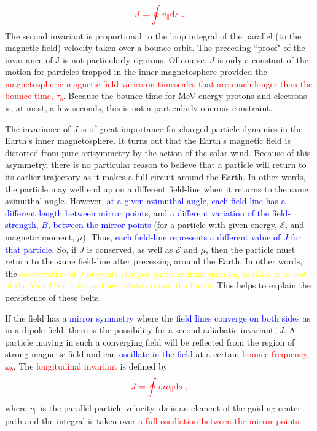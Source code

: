 \documentclass[12pt,a4paper]{article}
\newcommand{\dif}{\mathrm{d}}
\begin{document}
\begin{equation}
\color{red} J = \oint v_\parallel \dif s ~.
\end{equation}
The second invariant is proportional to the loop integral of the parallel (to the magnetic field) velocity taken over a bounce orbit. The preceding ``proof" of the invariance of J is not particularly rigorous. Of course, $J$ is only a constant of the motion for particles trapped in the inner magnetosphere provided the \textcolor{red}{magnetospheric magnetic field varies on timescales that are much longer than the bounce time, $\tau_b$}. Because the bounce time for MeV energy protons and electrons is, at most, a few seconds, this is not a particularly onerous constraint.

The invariance of $J$ is of great importance for charged particle dynamics in the Earth's inner magnetosphere. It turns out that the Earth's magnetic field is distorted from pure axisymmetry by the action of the solar wind. Because of this asymmetry, there is no particular reason to believe that a particle will return to its earlier trajectory as it makes a full circuit around the Earth. In other words, the particle may well end up on a different field-line when it returns to the same azimuthal angle. However, \textcolor{blue}{at a given azimuthal angle, each field-line has a different length between mirror points}, and \textcolor{blue}{a different variation of the field-strength, $B$, between the mirror points} (for a particle with given energy, $\mathcal E$, and magnetic moment, $\mu$). Thus, \textcolor{blue}{each field-line represents a different value of $J$ for that particle}. So, if $J$ is conserved, as well as $\mathcal E$ and $\mu$, then the particle must return to the same field-line after precessing around the Earth. In other words, the \textcolor{yellow}{conservation of $J$ prevents charged particles from spiraling radially in or out of the Van Allen belts as they rotate around the Earth}. This helps to explain the persistence of these belts.














\cite{1996bspp.book.....B} If the field has a \textcolor{blue}{mirror symmetry} where the \textcolor{blue}{field lines converge on both sides} as in a dipole field, there is the possibility for a second adiabatic invariant, $J$. A particle moving in such a converging field will be reflected from the region of strong magnetic field and can \textcolor{blue}{oscillate in the field} at a certain \textcolor{red}{bounce frequency, $\omega_b$}. The \textcolor{red}{longitudinal invariant} is defined by
\begin{equation}
\color{red} J = \oint m v_\parallel \dif s~,
\end{equation}
where $v_\parallel$ is the parallel particle velocity, $\dif s$ is an element of the guiding center path and the integral is taken over \textcolor{red}{a full oscillation between the mirror points}.
\end{document}
